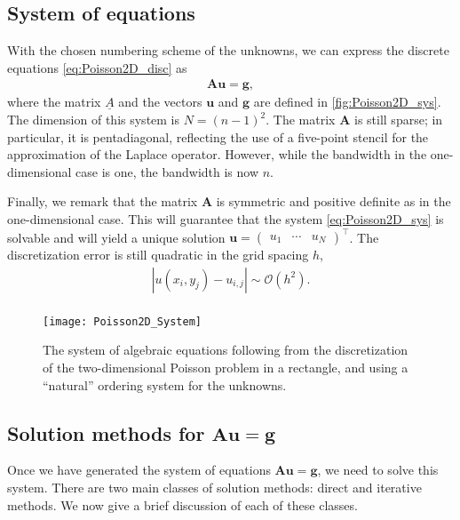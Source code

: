 \subsection{System of equations}

With the chosen numbering scheme of the unknowns, we can express the discrete
equations \autoref{eq:Poisson2D_disc} as
\begin{align}
  \bm A \bm u = \bm g,
  \label{eq:Poisson2D_sys}
\end{align}
where the matrix $\underline{A}$ and the vectors $\bm u$ and
$\bm g$ are defined in \autoref{fig:Poisson2D_sys}. The dimension of
this system is $N=(n-1)^2$. The matrix $\bm A$ is still sparse; in particular,
it is pentadiagonal, reflecting the use of a five-point stencil for the
approximation of the Laplace operator. However, while the bandwidth in the
one-dimensional case is one, the bandwidth is now $n$.

Finally, we remark that the matrix $\bm A$ is symmetric and positive definite as
in the one-dimensional case. This will guarantee that the system
\eqref{eq:Poisson2D_sys} is solvable and will yield a unique solution
$\bm u = \begin{pmatrix}u_1&\cdots&u_N\end{pmatrix}^\intercal$. The
discretization error is still quadratic in the grid spacing $h$,
\begin{align*}
  |u(x_i,y_j)-u_{i,j}| \sim \mathcal{O}(h^2). \\
\end{align*}

\begin{figure}
  \centering
  \texttt{[image: Poisson2D\_System]}
  \caption{
    The system of algebraic equations following from the discretization of the
    two-dimensional Poisson problem in a rectangle, and using a ``natural''
    ordering system for the unknowns.
  }
  \label{fig:Poisson2D_sys}
\end{figure}

\subsection{Solution methods for $\bm A \bm u = \bm g$}

Once we have generated the system of equations $\bm A \bm u = \bm g$, we need to
solve this system. There are two main classes of solution methods: direct and
iterative methods. We now give a brief discussion of each of these classes.


